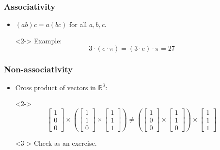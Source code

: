 \documentclass{beamer}
\theoremstyle{definition}
\begin{document}
\begin{frame}
\frametitle{Associativity}
\begin{itemize}
\item $(ab)c=a(bc)$ for all $a,b,c$.
\item[]<2-> Example: \[3\cdot (e\cdot \pi) = (3\cdot e)\cdot \pi = 27\]
\end{itemize}
\end{frame}

\begin{frame}
\frametitle{Non-associativity}
\begin{itemize}
\item<1-> Cross product of vectors in $\mathbb{R}^3$:
\item[]<2-> 
\[
 \begin{bmatrix}
1\\
0\\
0
\end{bmatrix}\times\left(\begin{bmatrix}
1\\
1\\
0
\end{bmatrix} \times \begin{bmatrix}
1\\
1\\
1
\end{bmatrix}\right) \neq \left(\begin{bmatrix}
1\\
0\\
0
\end{bmatrix}\times\begin{bmatrix}
1\\
1\\
0
\end{bmatrix}\right)\times\begin{bmatrix}
1\\
1\\
1
\end{bmatrix}
\]
\item[]<3-> Check as an exercise.
\end{itemize}


\end{frame}
\end{document}
